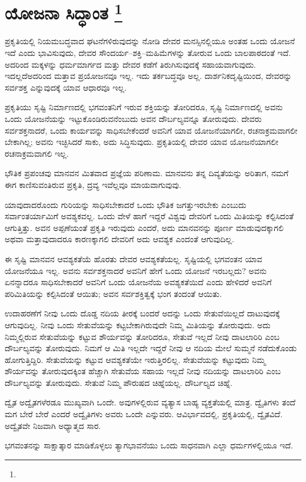 
\chapter[ಯೋಜನಾ ಸಿದ್ಧಾಂತ ]{ಯೋಜನಾ ಸಿದ್ಧಾಂತ \protect\footnote{}}

ಪ್ರಕೃತಿಯಲ್ಲಿ ನಿಯಮಬದ್ಧವಾದ ಘಟನೆಗಳಿರುವುದನ್ನು ನೋಡಿ ದೇವರ ಮನಸ್ಸಿನಲ್ಲಿಯೂ ಅಂತಹ ಒಂದು ಯೋಜನೆ ಇದೆ ಎಂದು ಭಾವಿಸುವುದು, ದೇವರ ಸೌಂದರ್ಯ–ಶಕ್ತಿ–ಮಹಿಮೆಗಳನ್ನು ತೋರುವ ಒಂದು ಬಾಲಪಾಠದಂತೆ ಇದೆ. ಅದರಿಂದ ಮಕ್ಕಳನ್ನು ಧರ್ಮಮಾರ್ಗದ ಮತ್ತು ದೇವರ ಕಡೆಗೆ ತಿರುಗಿಸುವುದಕ್ಕೆ ಸಹಾಯವಾಗುವುದು. ಇದಲ್ಲದೆ\break ಅದರಿಂದ ಮತ್ತಾವ ಪ್ರಯೋಜನವೂ ಇಲ್ಲ. ಇದು ತರ್ಕಬದ್ಧವೂ ಅಲ್ಲ. ದಾರ್ಶನಿಕ\break ದೃಷ್ಟಿಯಿಂದ, ದೇವರನ್ನು ಸರ್ವಶಕ್ತ ಎನ್ನುವುದಕ್ಕೆ ಯಾವ ಆಧಾರವೂ ಇಲ್ಲ.

ಪ್ರಕೃತಿಯು ಸೃಷ್ಟಿ ನಿರ್ಮಾಣದಲ್ಲಿ ಭಗವಂತನಿಗೆ ಇರುವ ಶಕ್ತಿಯನ್ನು ತೋರಿದರೂ, ಸೃಷ್ಟಿ ನಿರ್ಮಾಣದಲ್ಲಿ ಅವನು ಒಂದು ಯೋಜನೆಯನ್ನು ಇಟ್ಟುಕೊಂಡಿರುವನೆಂಬುದು ಅವನ ದೌರ್ಬಲ್ಯವನ್ನೂ ತೋರುವುದು. ದೇವರು ಸರ್ವಶಕ್ತನಾದರೆ, ಒಂದು ಕಾರ್ಯವನ್ನು ಸಾಧಿಸಬೇಕೆಂದರೆ ಅವನಿಗೆ ಯಾವ ಯೋಜನೆಯಾಗಲೀ, ರಚನಾಕ್ರಮವಾಗಲೀ ಬೇಕಾಗಿಲ್ಲ; ಅವನು ಇಚ್ಛಿಸಿದರೆ ಸಾಕು, ಅದು ಸಿದ್ಧಿಸುವುದು. ಪ್ರಕೃತಿಯಲ್ಲಿ ದೇವರ ಯಾವ ಯೋಜನೆಯಾಗಲೀ ರಚನಾಕ್ರಮವಾಗಲಿ ಇಲ್ಲ.

ಭೌತಿಕ ಪ್ರಪಂಚವು ಮಾನವನ ಮಿತವಾದ ಪ್ರಜ್ಞೆಯ ಪರಿಣಾಮ. ಮಾನವನು ತನ್ನ ದಿವ್ಯತೆಯನ್ನು ಅರಿತಾಗ, ನಮಗೆ ಈಗ ಕಾಣಿಸುವಂತಿರುವ ಪ್ರಕೃತಿ, ದ್ರವ್ಯ ಇವೆಲ್ಲವೂ ಮಾಯವಾಗುವುವು.

ಯಾವುದಾದರೊಂದು ಗುರಿಯನ್ನು ಸಾಧಿಸಬೇಕಾದರೆ ಒಂದು ಭೌತಿಕ ಜಗತ್ತು\break ಇರಬೇಕು ಎಂಬುದು ಸರ್ವಾಂತರ್ಯಾಮಿಗೆ ಅವಶ್ಯಕವಲ್ಲ. ಒಂದು ವೇಳೆ ಹಾಗೆ ಇದ್ದರೆ ವಿಶ್ವವು ದೇವರಿಗೆ ಒಂದು ಮಿತಿಯನ್ನು ಕಲ್ಪಿಸಿದಂತೆ ಆಗುತ್ತಿತ್ತು. ಅವನ ಅಪ್ಪಣೆಯಂತೆ ಪ್ರಕೃತಿ ಇರುವುದು ಎಂದರೆ, ಅದು ಮಾನವನನ್ನು ಪೂರ್ಣ ಮಾಡುವುದಕ್ಕಾಗಲಿ ಅಥವಾ ಮತ್ತಾವುದಾದರೂ ಕಾರಣಕ್ಕಾಗಲಿ ದೇವರಿಗೆ ಅದು ಆವಶ್ಯಕ ಎಂದಂತೆ ಆಗುವುದಿಲ್ಲ.

ಈ ಸೃಷ್ಟಿ ಮಾನವನ ಆವಶ್ಯಕತೆಯೆ ಹೊರತು ದೇವರ ಆವಶ್ಯಕತೆಯಲ್ಲ. ಸೃಷ್ಟಿಯಲ್ಲಿ ಭಗವಂತನ ಯಾವ ಯೋಜನೆಯೂ ಇಲ್ಲ. ಅವನು ಸರ್ವಶಕ್ತನಾದರೆ ಅವನಿಗೆ ಹೇಗೆ ಒಂದು ಯೋಜನೆ ಇರಬಲ್ಲದು? ಅವನು ಏನನ್ನಾದರೂ ಸಾಧಿಸಬೇಕಾದರೆ ಅವನಿಗೆ ಒಂದು ಯೋಜನೆಯ ಅವಶ್ಯಕತೆಯಿದೆ ಎಂದು ಹೇಳಿದರೆ ಅವನಿಗೆ ಪರಿಮಿತಿಯನ್ನು ಕಲ್ಪಿಸಿದಂತೆ ಆಯಿತು; ಅವನ ಸರ್ವಶಕ್ತಿತ್ವಕ್ಕೆ ಭಂಗ ತಂದಂತೆ ಆಯಿತು.

ಉದಾಹರಣೆಗೆ ನೀವು ಒಂದು ದೊಡ್ಡ ನದಿಯ ತೀರಕ್ಕೆ ಬಂದರೆ ಅದನ್ನು ಒಂದು ಸೇತುವೆಯಿಲ್ಲದೆ ದಾಟುವುದಕ್ಕೆ ಆಗುವುದಿಲ್ಲ. ನೀವು ಒಂದು ಸೇತುವೆಯನ್ನು ಕಟ್ಟಬೇಕಾಗಿರುವುದೇ ನಿಮ್ಮ ಮಿತಿಯನ್ನು ತೋರುವುದು. ಅದು ನಿಮ್ಮಲ್ಲಿರುವ ಸೇತುವೆಯನ್ನು ಕಟ್ಟುವ ಶೌರ್ಯವನ್ನು ತೋರಿದರೂ, ಸೇತುವೆ ಇಲ್ಲದೆ ನೀವು ದಾಟಲಾರಿರಿ ಎಂಬ ದೌರ್ಬಲ್ಯವನ್ನು ತೋರುವುದು. ನಿಮಗೆ ಆ ಮಿತಿ ಇಲ್ಲದೇ ಇದ್ದರೆ ನೀವು ಆ ನದಿಯ ಮೇಲೆ ಸುಮ್ಮನೆ ನಡೆದುಕೊಂಡು ಹೋಗುತ್ತಿದ್ದಿರಿ. ಸೇತುವೆಯನ್ನು ಕಟ್ಟುವ ಆವಶ್ಯಕತೆಯೇ ಇರುತ್ತಿರಲಿಲ್ಲ. ಸೇತುವೆಯನ್ನು ಕಟ್ಟುವುದು ನಿಮ್ಮ ಶೌರ್ಯವನ್ನು ತೋರುವುದಕ್ಕಿಂತ ಹೆಚ್ಚಾಗಿ ಸೇತುವೆಯ ಸಹಾಯ ಇಲ್ಲದೆ ನೀವು ನದಿಯನ್ನು ದಾಟಲಾರಿರಿ ಎಂಬ ದೌರ್ಬಲ್ಯವನ್ನು ತೋರುವುದು. ಸೇತುವೆ ನಿಮ್ಮ ಪೌರುಷದ ಚಿಹ್ನೆಯಲ್ಲ. ದೌರ್ಬಲ್ಯದ ಚಿಹ್ನೆ.

ದ್ವೈತ ಅದ್ವೈತಗಳೆರಡೂ ಮುಖ್ಯವಾಗಿ ಒಂದೇ. ಅವುಗಳಲ್ಲಿರುವ ವ್ಯತ್ಯಾಸ ಬಾಹ್ಯ ವ್ಯಕ್ತತೆಯಲ್ಲಿ ಮಾತ್ರ. ದ್ವೈತಿಗಳು ತಂದೆ ಮಗ ಬೇರೆ ಬೇರೆ ಎಂದರೆ ಅದ್ವೈತಿಗಳು ಅವರು ಒಂದೇ ಎನ್ನುವರು. ಆವಿರ್ಭಾವದಲ್ಲಿ, ಪ್ರಕೃತಿಯಲ್ಲಿ, ದ್ವೈತವಿದೆ. ಅದ್ವೈತವೇ ನಿಜವಾಗಿ ಅಧ್ಯಾತ್ಮದ ಸಾರ.

ಭಗವಂತನನ್ನು ಸಾಕ್ಷಾತ್ಕಾರ ಮಾಡಿಕೊಳ್ಳಲು ತ್ಯಾಗಭಾವನೆಯು ಒಂದು ಸಾಧನವಾಗಿ ಎಲ್ಲಾ ಧರ್ಮಗಳಲ್ಲಿಯೂ ಇದೆ.

